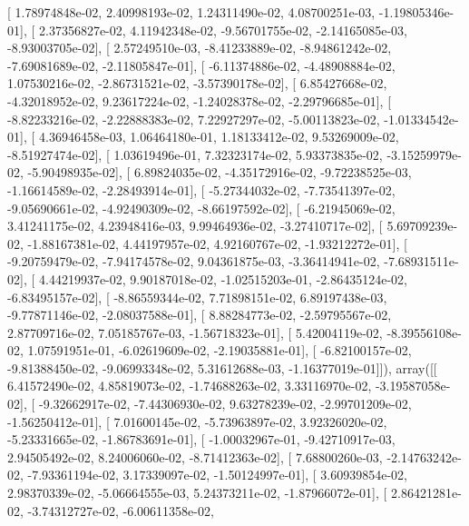 \documentclass{article}
\begin{document}
       [  1.78974848e-02,   2.40998193e-02,   1.24311490e-02,
          4.08700251e-03,  -1.19805346e-01],
       [  2.37356827e-02,   4.11942348e-02,  -9.56701755e-02,
         -2.14165085e-03,  -8.93003705e-02],
       [  2.57249510e-03,  -8.41233889e-02,  -8.94861242e-02,
         -7.69081689e-02,  -2.11805847e-01],
       [ -6.11374886e-02,  -4.48908884e-02,   1.07530216e-02,
         -2.86731521e-02,  -3.57390178e-02],
       [  6.85427668e-02,  -4.32018952e-02,   9.23617224e-02,
         -1.24028378e-02,  -2.29796685e-01],
       [ -8.82233216e-02,  -2.22888383e-02,   7.22927297e-02,
         -5.00113823e-02,  -1.01334542e-01],
       [  4.36946458e-03,   1.06464180e-01,   1.18133412e-02,
          9.53269009e-02,  -8.51927474e-02],
       [  1.03619496e-01,   7.32323174e-02,   5.93373835e-02,
         -3.15259979e-02,  -5.90498935e-02],
       [  6.89824035e-02,  -4.35172916e-02,  -9.72238525e-03,
         -1.16614589e-02,  -2.28493914e-01],
       [ -5.27344032e-02,  -7.73541397e-02,  -9.05690661e-02,
         -4.92490309e-02,  -8.66197592e-02],
       [ -6.21945069e-02,   3.41241175e-02,   4.23948416e-03,
          9.99464936e-02,  -3.27410717e-02],
       [  5.69709239e-02,  -1.88167381e-02,   4.44197957e-02,
          4.92160767e-02,  -1.93212272e-01],
       [ -9.20759479e-02,  -7.94174578e-02,   9.04361875e-03,
         -3.36414941e-02,  -7.68931511e-02],
       [  4.44219937e-02,   9.90187018e-02,  -1.02515203e-01,
         -2.86435124e-02,  -6.83495157e-02],
       [ -8.86559344e-02,   7.71898151e-02,   6.89197438e-03,
         -9.77871146e-02,  -2.08037588e-01],
       [  8.88284773e-02,  -2.59795567e-02,   2.87709716e-02,
          7.05185767e-03,  -1.56718323e-01],
       [  5.42004119e-02,  -8.39556108e-02,   1.07591951e-01,
         -6.02619609e-02,  -2.19035881e-01],
       [ -6.82100157e-02,  -9.81388450e-02,  -9.06993348e-02,
          5.31612688e-03,  -1.16377019e-01]]), array([[  6.41572490e-02,   4.85819073e-02,  -1.74688263e-02,
          3.33116970e-02,  -3.19587058e-02],
       [ -9.32662917e-02,  -7.44306930e-02,   9.63278239e-02,
         -2.99701209e-02,  -1.56250412e-01],
       [  7.01600145e-02,  -5.73963897e-02,   3.92326020e-02,
         -5.23331665e-02,  -1.86783691e-01],
       [ -1.00032967e-01,  -9.42710917e-03,   2.94505492e-02,
          8.24006060e-02,  -8.71412363e-02],
       [  7.68800260e-03,  -2.14763242e-02,  -7.93361194e-02,
          3.17339097e-02,  -1.50124997e-01],
       [  3.60939854e-02,   2.98370339e-02,  -5.06664555e-03,
          5.24373211e-02,  -1.87966072e-01],
       [  2.86421281e-02,  -3.74312727e-02,  -6.00611358e-02,
\end{document}
